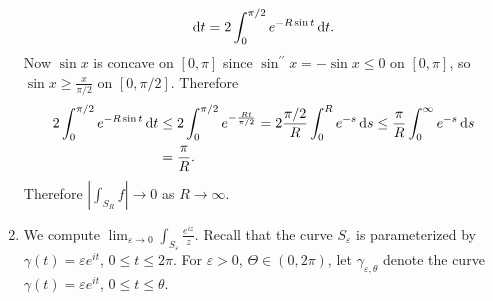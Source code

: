 \begin{xmpl}
\begin{enumerate}
{\begin{align*}
              \mathop{}\!\mathrm{d} t
       =    2 \int_0^{\pi / 2}
                e^{-R \sin t}
                \mathop{}\!\mathrm{d} t.
      \end{align*}
      Now $\sin x$ is concave on $[0, \pi]$ since
      $\sin^{\prime\prime} x = - \sin x \leq 0$ on $[0, \pi]$,
      so $\sin x \geq \frac{x}{\pi / 2}$ on $[0, \pi / 2]$.
      Therefore
      \begin{align*}
            2 \int_0^{\pi / 2}
                e^{-R \sin t}
                \mathop{}\!\mathrm{d} t
      &\leq 2 \int_0^{\pi / 2} e^{-\frac{R t}{\pi / 2}}
       =    2 \frac{\pi / 2}{R}
            \int_0^R
              e^{-s}
              \mathop{}\!\mathrm{d} s
       \leq \frac{\pi}{R}
            \int_0^\infty
              e^{-s}
              \mathop{}\!\mathrm{d} s \\
      &=    \frac{\pi}{R}.
      \end{align*}
      Therefore $\left| \int_{S_R} f \right| \to 0$ as $R \to \infty$.
    }
    \item{
      We compute $\lim_{\varepsilon \to 0} \int_{S_\varepsilon}
      \frac{e^{iz}}{z}$.
      Recall that the curve $S_\varepsilon$ is parameterized by
      $\gamma(t) = \varepsilon e^{it}$, $0 \leq t \leq 2 \pi$.
      For $\varepsilon > 0$, $\Theta \in (0, 2 \pi)$, let
      $\gamma_{\varepsilon, \theta}$ denote the curve
      $\gamma(t) = \varepsilon e^{it}$, $0 \leq t \leq \theta$.

}
\end{enumerate}
\end{xmpl}
